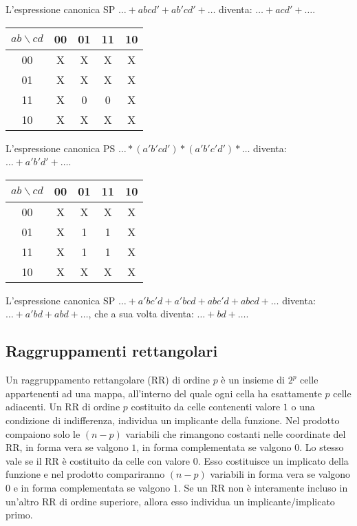 \documentclass{article}
\begin{document}
\noindent
L'espressione canonica SP $\dots + abcd' + ab'cd' + \dots$ diventa: $\dots + acd' + \dots$.

\begin{center}
\begin{tabular}{ |c|c|c|c|c| }
\hline
$ab \backslash cd$ & 00 & 01 & 11 & 10 \\
\hline
\hline
00 & X & X & X & X \\
01 & X & X & X & X \\
11 & X & 0 & 0 & X \\
10 & X & X & X & X \\
\hline
\end{tabular}
\end{center}

\noindent
L'espressione canonica PS $\dots * (a'b'cd') * (a'b'c'd') * \dots$ diventa: $\dots + a'b'd' + \dots$.

\begin{center}
\begin{tabular}{ |c|c|c|c|c| }
\hline
$ab \backslash cd$ & 00 & 01 & 11 & 10 \\
\hline
\hline
00 & X & X & X & X \\
01 & X & 1 & 1 & X \\
11 & X & 1 & 1 & X \\
10 & X & X & X & X \\
\hline
\end{tabular}
\end{center}

\noindent
L'espressione canonica SP $\dots + a'bc'd + a'bcd + abc'd + abcd + \dots$ diventa: $\dots + a'bd + abd + \dots$,
che a sua volta diventa: $\dots + bd + \dots$.

\subsection{Raggruppamenti rettangolari}

Un raggruppamento rettangolare (RR) di ordine $p$ è un insieme di $2^p$ celle appartenenti ad una mappa, all'interno del quale ogni cella ha esattamente $p$ celle adiacenti.
Un RR di ordine $p$ costituito da celle contenenti valore $1$ o una condizione di indifferenza, individua un implicante della funzione.
Nel prodotto compaiono solo le $(n-p)$ variabili che rimangono costanti nelle coordinate del RR, in forma vera se valgono $1$, in forma complementata se valgono $0$.
Lo stesso vale se il RR è costituito da celle con valore $0$. Esso costituisce un implicato della funzione e nel prodotto compariranno $(n-p)$ variabili in forma vera se valgono $0$ e in forma complementata se valgono $1$.
Se un RR non è interamente incluso in un'altro RR di ordine superiore, allora esso individua un implicante/implicato primo.\\
\end{document}
